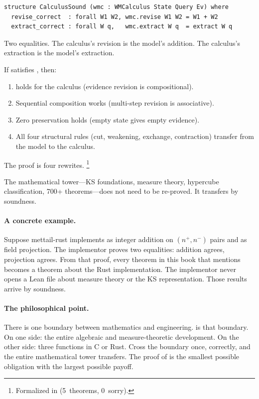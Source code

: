 \documentclass[11pt,openany]{report}
\begin{document}
\begin{lstlisting}[language={}]
structure CalculusSound (wmc : WMCalculus State Query Ev) where
  revise_correct  : forall W1 W2, wmc.revise W1 W2 = W1 + W2
  extract_correct : forall W q,   wmc.extract W q  = extract W q
\end{lstlisting}

\noindent
Two equalities.  The calculus's revision is the model's addition.
The calculus's extraction is the model's extraction.

\begin{theorem}
\label{thm:calculus-sound-inheritance}
If  satisfies , then:
\begin{enumerate}
\item {} holds for the calculus (evidence
  revision is compositional).
\item Sequential composition works (multi-step revision is
  associative).
\item Zero preservation holds (empty state gives empty evidence).
\item All four structural rules (cut, weakening, exchange,
  contraction) transfer from the model to the calculus.
\end{enumerate}
The proof is four rewrites.%
\footnote{Formalized in
(5~theorems, 0~sorry).}
\end{theorem}

\noindent
The mathematical tower---KS foundations, measure theory,
hypercube classification, 700+ theorems---does not need to be
re-proved.  It transfers by soundness.

\paragraph{A concrete example.}
Suppose mettail-rust implements  as integer addition
on $(n^+, n^-)$ pairs and  as field projection.
The implementor proves two equalities: addition agrees,
projection agrees.  From that proof, every theorem in this book
that mentions  becomes a theorem about the
Rust implementation.  The implementor never opens a Lean file
about measure theory or the KS representation.  Those results
arrive by soundness.

\paragraph{The philosophical point.}
There is one boundary between mathematics and engineering.
 is that boundary.  On one side: the entire
algebraic and measure-theoretic development.  On the other side:
three functions in C or Rust.  Cross the boundary once, correctly,
and the entire mathematical tower transfers.  The proof of
 is the smallest possible obligation with the
largest possible payoff.
\end{document}
